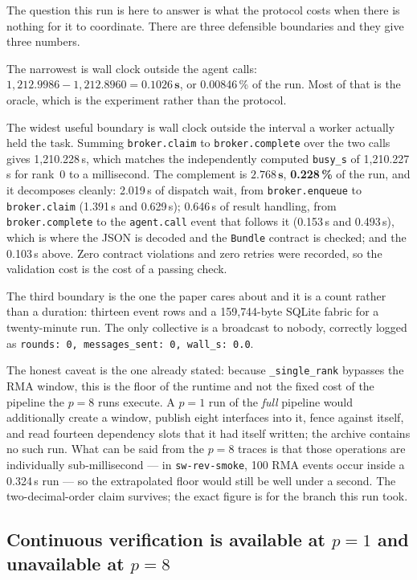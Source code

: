 \documentclass[11pt]{article}
\begin{document}
The question this run is here to answer is what the protocol costs when there is nothing for
it to coordinate. There are three defensible boundaries and they give three numbers.

The narrowest is wall clock outside the agent calls: $1{,}212.9986 - 1{,}212.8960 =
\mathbf{0.1026\,s}$, or 0.00846\,\% of the run. Most of that is the oracle, which is the
experiment rather than the protocol.

The widest useful boundary is wall clock outside the interval a worker actually held the
task. Summing \texttt{broker.claim} to \texttt{broker.complete} over the two calls gives
1{,}210.228\,s, which matches the independently computed \texttt{busy\_s} of 1{,}210.227\,s
for rank~0 to a millisecond. The complement is $\mathbf{2.768\,s}$, \textbf{0.228\,\%} of the
run, and it decomposes cleanly: 2.019\,s of dispatch wait, from \texttt{broker.enqueue} to
\texttt{broker.claim} (1.391\,s and 0.629\,s); 0.646\,s of result handling, from
\texttt{broker.complete} to the \texttt{agent.call} event that follows it (0.153\,s and
0.493\,s), which is where the JSON is decoded and the \texttt{Bundle} contract is checked; and
the 0.103\,s above. Zero contract violations and zero retries were recorded, so the validation
cost is the cost of a passing check.

The third boundary is the one the paper cares about and it is a count rather than a duration:
thirteen event rows and a 159{,}744-byte SQLite fabric for a twenty-minute run. The only
collective is a broadcast to nobody, correctly logged as \texttt{rounds: 0, messages\_sent: 0,
wall\_s: 0.0}.

The honest caveat is the one already stated: because \texttt{\_single\_rank} bypasses the RMA
window, this is the floor of the runtime and not the fixed cost of the pipeline the $p=8$ runs
execute. A $p=1$ run of the \emph{full} pipeline would additionally create a window, publish
eight interfaces into it, fence against itself, and read fourteen dependency slots that it had
itself written; the archive contains no such run. What can be said from the $p=8$ traces is
that those operations are individually sub-millisecond --- in \texttt{sw-rev-smoke}, 100 RMA
events occur inside a 0.324\,s run --- so the extrapolated floor would still be well under a
second. The two-decimal-order claim survives; the exact figure is for the branch this run
took.

\subsection*{Continuous verification is available at $p=1$ and unavailable at $p=8$}
\label{sec:verify}
\end{document}
